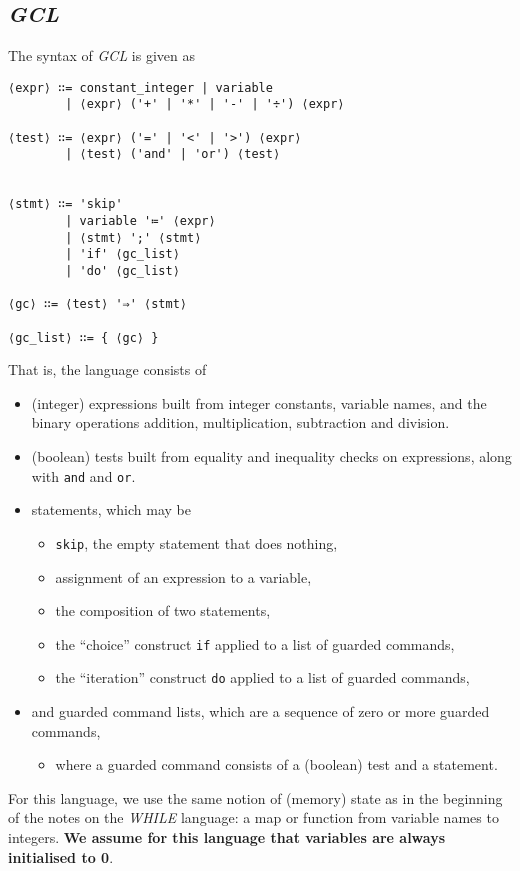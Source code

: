 \documentclass[11pt]{article}
\theoremstyle{definition}
\begin{document}
\subsection*{\emph{GCL}}
\label{sec:orge47e448}
The syntax of \emph{GCL} is given as
\begin{verbatim}
⟨expr⟩ ∷= constant_integer | variable
        | ⟨expr⟩ ('+' | '*' | '-' | '÷') ⟨expr⟩

⟨test⟩ ∷= ⟨expr⟩ ('=' | '<' | '>') ⟨expr⟩
        | ⟨test⟩ ('and' | 'or') ⟨test⟩


⟨stmt⟩ ∷= 'skip'
        | variable '≔' ⟨expr⟩
        | ⟨stmt⟩ ';' ⟨stmt⟩
        | 'if' ⟨gc_list⟩
        | 'do' ⟨gc_list⟩

⟨gc⟩ ∷= ⟨test⟩ '⇒' ⟨stmt⟩

⟨gc_list⟩ ∷= { ⟨gc⟩ }
\end{verbatim}
That is, the language consists of
\begin{itemize}
\item (integer) expressions built from integer constants, variable names,
and the binary operations addition, multiplication, subtraction and division.
\item (boolean) tests built from equality and inequality checks on expressions,
along with \texttt{and} and \texttt{or}.
\item statements, which may be
\begin{itemize}
\item \texttt{skip}, the empty statement that does nothing,
\item assignment of an expression to a variable,
\item the composition of two statements,
\item the “choice” construct \texttt{if} applied to a list of guarded commands,
\item the “iteration” construct \texttt{do} applied to a list of guarded commands,
\end{itemize}
\item and guarded command lists, which are
a sequence of zero or more guarded commands,
\begin{itemize}
\item where a guarded command consists of a (boolean) test and a statement.
\end{itemize}
\end{itemize}

For this language, we use the same notion of (memory) state as in
the beginning of the notes on the \emph{WHILE} language:
a map or function from variable names to integers.
\textbf{We assume for this language that variables are always initialised to 0}.
\end{document}
